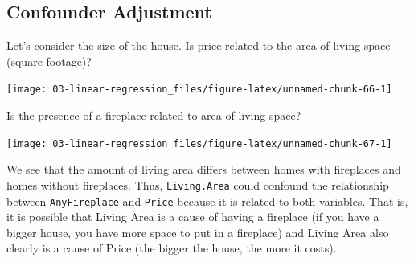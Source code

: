\documentclass[
]{book}
\newenvironment{Shaded}{\begin{snugshade}}{\end{snugshade}}
\newcommand{\DataTypeTok}[1]{\textcolor[rgb]{0.13,0.29,0.53}{#1}}
\newcommand{\KeywordTok}[1]{\textcolor[rgb]{0.13,0.29,0.53}{\textbf{#1}}}
\newcommand{\NormalTok}[1]{#1}
\newcommand{\OperatorTok}[1]{\textcolor[rgb]{0.81,0.36,0.00}{\textbf{#1}}}
\newcommand{\StringTok}[1]{\textcolor[rgb]{0.31,0.60,0.02}{#1}}
\begin{document}
\hypertarget{confounder-adjustment}{%
\subsection{Confounder Adjustment}\label{confounder-adjustment}}

Let's consider the size of the house. Is price related to the area of living space (square footage)?

\begin{Shaded}
\end{Shaded}

\begin{center}\texttt{[image: 03-linear-regression\_files/figure-latex/unnamed-chunk-66-1]} \end{center}

Is the presence of a fireplace related to area of living space?

\begin{Shaded}
\end{Shaded}

\begin{center}\texttt{[image: 03-linear-regression\_files/figure-latex/unnamed-chunk-67-1]} \end{center}

We see that the amount of living area differs between homes with fireplaces and homes without fireplaces. Thus, \texttt{Living.Area} could confound the relationship between \texttt{AnyFireplace} and \texttt{Price} because it is related to both variables. That is, it is possible that Living Area is a cause of having a fireplace (if you have a bigger house, you have more space to put in a fireplace) and Living Area also clearly is a cause of Price (the bigger the house, the more it costs).
\end{document}
